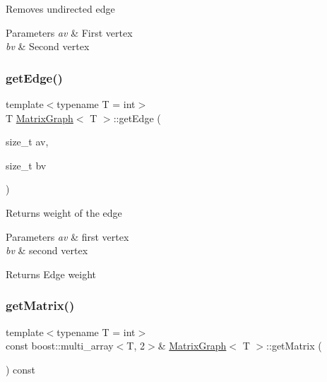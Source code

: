 Removes undirected edge 
\begin{DoxyParams}{Parameters}
{\em av} & First vertex \\
\hline
{\em bv} & Second vertex \\
\hline
\end{DoxyParams}
\mbox{\label{class_matrix_graph_af1e22d0a92d5475011c0073e84c2c254}} 
\subsubsection{\texorpdfstring{get\+Edge()}{getEdge()}}
{\footnotesize\ttfamily template$<$typename T = int$>$ \\
T \hyperlink{class_matrix_graph}{Matrix\+Graph}$<$ T $>$\+::get\+Edge (\begin{DoxyParamCaption}\item[{size\+\_\+t}]{av,  }\item[{size\+\_\+t}]{bv }\end{DoxyParamCaption})\hspace{0.3cm}{\ttfamily [inline]}}

Returns weight of the edge 
\begin{DoxyParams}{Parameters}
{\em av} & first vertex \\
\hline
{\em bv} & second vertex \\
\hline
\end{DoxyParams}
\begin{DoxyReturn}{Returns}
Edge weight 
\end{DoxyReturn}
\mbox{\label{class_matrix_graph_ae6b799585fda6e65cb2fa6693cc8603e}} 
\subsubsection{\texorpdfstring{get\+Matrix()}{getMatrix()}}
{\footnotesize\ttfamily template$<$typename T = int$>$ \\
const boost\+::multi\+\_\+array$<$T, 2$>$\& \hyperlink{class_matrix_graph}{Matrix\+Graph}$<$ T $>$\+::get\+Matrix (\begin{DoxyParamCaption}{ }\end{DoxyParamCaption}) const\hspace{0.3cm}{\ttfamily [inline]}}

